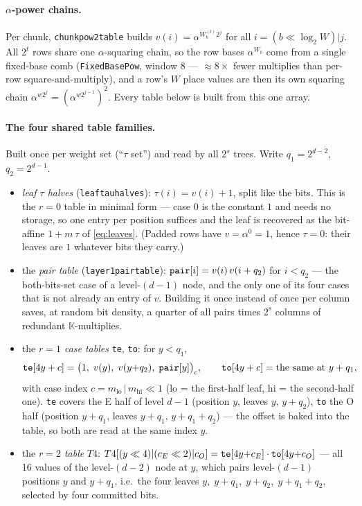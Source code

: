 \documentclass[11pt]{article}
\newcommand{\K}{\mathbb{K}}            %
\newcommand{\code}[1]{{\def\_{\textunderscore\allowbreak}\texttt{#1}}}
\theoremstyle{definition}
\begin{document}
\paragraph{$\alpha$-power chains.}
Per chunk, \code{chunk\_pow2\_table} builds
$v(i) = \alpha^{W^{(l)}_b 2^j}$ for all $i = (b \ll \log_2 W)|j$.  All
$2^t$ rows share one $\alpha$-squaring chain, so the row bases
$\alpha^{W_b}$ come from a single fixed-base comb (\code{FixedBasePow},
window 8 --- ${\approx}8\times$ fewer multiplies than per-row
square-and-multiply), and a row's $W$ place values are then its own
squaring chain $\alpha^{w2^j} = (\alpha^{w2^{j-1}})^2$.  Every table
below is built from this one array.

\paragraph{The four shared table families.}
Built once per weight set (``$\tau$ set'') and read by all $2^s$ trees.
Write $q_1 = 2^{d-2}$, $q_2 = 2^{d-1}$.
\begin{itemize}[itemsep=2pt]
\item \emph{leaf $\tau$ halves} (\code{leaf\_tau\_halves}):
  $\tau(i) = v(i) + 1$, split like the bits.  This is the $r = 0$ table
  in minimal form --- case $0$ is the constant $1$ and needs no storage,
  so one entry per position suffices and the leaf is recovered as the
  bit-affine $1 + m\,\tau$ of \eqref{eq:leaves}.  (Padded rows have
  $v = \alpha^0 = 1$, hence $\tau = 0$: their leaves are $1$ whatever
  bits they carry.)
\item the \emph{pair table} (\code{layer1\_pair\_table}):
  $\code{pair}[i] = v(i)\,v(i + q_2)$ for $i < q_2$ --- the
  both-bits-set case of a level-$(d{-}1)$ node, and the only one of its
  four cases that is not already an entry of $v$.  Building it once
  instead of once per column saves, at random bit density, a quarter of
  all pairs times $2^s$ columns of redundant $\K$-multiplies.
\item the \emph{$r = 1$ case tables} \code{te}, \code{to}: for $y < q_1$,
  \[
    \code{te}[4y + c] = \big(1,\; v(y),\; v(y{+}q_2),\;
      \code{pair}[y]\big)_c , \qquad
    \code{to}[4y + c] = \text{the same at } y + q_1 ,
  \]
  with case index $c = m_{\mathrm{lo}} \,|\, m_{\mathrm{hi}}{\ll}1$
  ($\mathrm{lo}$ = the first-half leaf, $\mathrm{hi}$ = the second-half
  one).  \code{te} covers the E half of level $d{-}1$ (position $y$,
  leaves $y,\,y{+}q_2$), \code{to} the O half (position $y{+}q_1$,
  leaves $y{+}q_1,\,y{+}q_1{+}q_2$) --- the offset is baked into the
  table, so both are read at the same index $y$.
\item the \emph{$r = 2$ table} $T4$:
  $T4[(y \ll 4)|(c_E \ll 2)|c_O] =
   \code{te}[4y{+}c_E]\cdot\code{to}[4y{+}c_O]$ --- all 16 values of the
  level-$(d{-}2)$ node at $y$, which pairs level-$(d{-}1)$ positions $y$
  and $y + q_1$, i.e.\ the four leaves
  $y,\; y{+}q_1,\; y{+}q_2,\; y{+}q_1{+}q_2$, selected by four committed
  bits.
\end{itemize}
\end{document}
